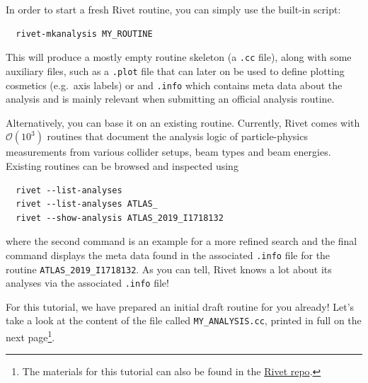 \documentclass[10pt,fleqn]{scrartcl}
\theoremstyle{exstyle}
\begin{document}
In order to start a fresh Rivet routine, you can simply use the built-in script:
\begin{verbatim}
  rivet-mkanalysis MY_ROUTINE
\end{verbatim}
This will produce a mostly empty routine skeleton (a \texttt{.cc} file),
along with some auxiliary files, such as a \texttt{.plot} file that can
later on be used to define plotting cosmetics (e.g.\ axis labels) or
and \texttt{.info} which contains meta data about the analysis and
is mainly relevant when submitting an official analysis routine.

Alternatively, you can base it on an existing routine. Currently, Rivet comes
with $\mathcal{O}(10^3)$ routines that document the analysis logic of
particle-physics measurements from various collider setups, beam types
and beam energies. Existing routines can be browsed and inspected using
\begin{verbatim}
  rivet --list-analyses
  rivet --list-analyses ATLAS_
  rivet --show-analysis ATLAS_2019_I1718132
\end{verbatim}
where the second command is an example for a more refined search and
the final command displays the meta data found in the associated
\texttt{.info} file for the routine \verb|ATLAS_2019_I1718132|.
As you can tell, Rivet knows a lot about its analyses
via the associated \texttt{.info} file!

For this tutorial, we have prepared an initial draft routine for you already!
Let's take a look at the content of the file called \verb|MY_ANALYSIS.cc|,
printed in full on the next page\footnote{The materials for this tutorial
can also be found in the
\href{https://gitlab.com/hepcedar/rivet/-/tree/release-4-0-x/doc/tutorials/lhc-basic-tutorial}{Rivet repo}.}.
\end{document}
